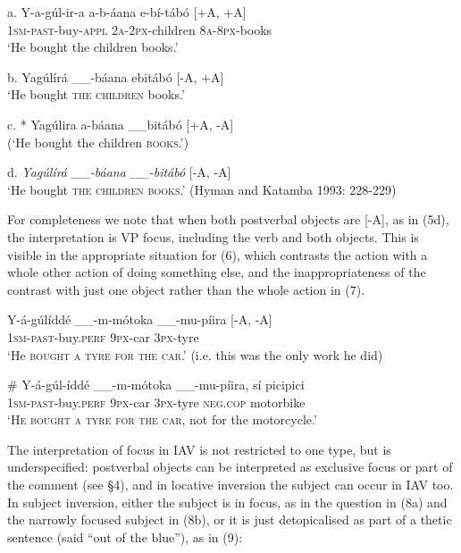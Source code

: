 \documentclass[output=paper]{langsci/langscibook}
\begin{document}
\ea
\gll a.  Y-a-gúl-ir-a      a-b-áana    e-bí-tábó  \textup{[+A, +A]}\\
       1\textsc{sm}{}-\textsc{past}{}-buy-\textsc{appl  }  \textsc{2a-2px}{}-children  \textsc{8a-8px}{}-books\\
\glt   ‘He bought the children books.’             
\z

\ea
  b.  Yagúlírá \_\_-báana ebitábó            \textup{[-A, +A]} \\
\glt   ‘He bought \textsc{the children} books.’           
\z

\ea
  c.  * Yagúlira a-báana \_\_bitábó            \textup{[+A, -A]}\\
\glt   (‘He bought the children \textsc{books}.’)           
\z

\ea
\glt d.  \textit{Yagúlírá \_\_-báana \_\_-bitábó}            [-A, -A]\\
  ‘He bought \textsc{the children books}.’ (Hyman and Katamba 1993: 228-229)
\z

For completeness we note that when both postverbal objects are [-A], as in (5d), the interpretation is VP focus, including the verb and both objects. This is visible in the appropriate situation for (6), which contrasts the action with a whole other action of doing something else, and the inappropriateness of the contrast with just one object rather than the whole action in (7).

\ea
\gll Y-á-gúlíddé    \_\_-m-mótoka    \_\_-mu-píira      \textup{[-A, -A]}\\
 \textsc{1sm-past}{}-buy.\textsc{perf}       \textsc{9px}{}-car              \textsc{3px}{}-tyre\\
\glt‘He \textsc{bought a tyre for the car}.’ (i.e. this was the only work he did) 
\z

\ea
\gll \# Y-á-gúl-íddé      \_\_-m-mótoka    \_\_-mu-píira,  sí    picipici\\
     \textsc{1sm-past}{}-buy.\textsc{perf    }   \textsc{9px}{}-car       \textsc{3px}{}-tyre   \textsc{neg}.\textsc{cop}  motorbike\\
\glt   ‘\textsc{He bought a tyre for the car}, not for the motorcycle.’
\z

The interpretation of focus in IAV is not restricted to one type, but is underspecified: postverbal objects can be interpreted as exclusive focus or part of the comment (see §4), and in locative inversion the subject can occur in IAV too. In subject inversion, either the subject is in focus, as in the question in (8a) and the narrowly focused subject in (8b), or it is just detopicalised as part of a thetic sentence (said “out of the blue”), as in (9):
\end{document}
